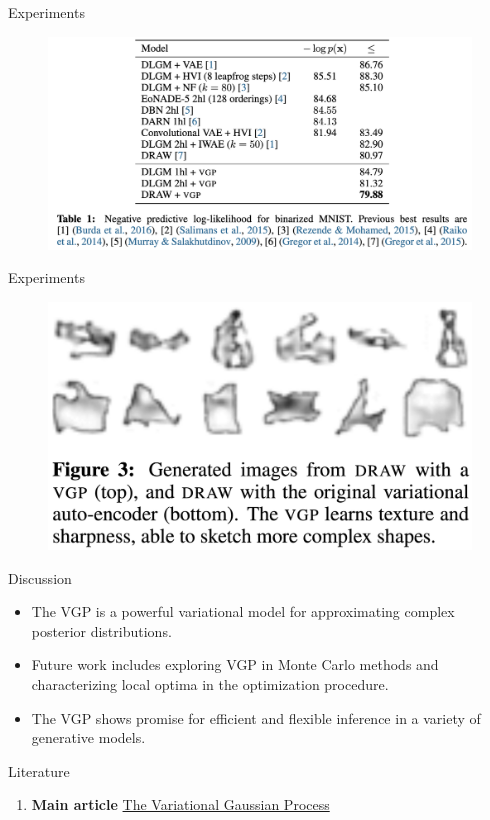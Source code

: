 \documentclass{beamer}
\begin{document}
\begin{frame}{Experiments}
    \begin{figure}{}
        \centering
        \includegraphics[scale=0.25]{images/table.png}
    \end{figure}
\end{frame}

\begin{frame}{Experiments}
    \begin{figure}{}
        \centering
        \includegraphics[scale=0.2]{images/figure3.png}
    \end{figure}

\end{frame}

\begin{frame}{Discussion}
    \begin{itemize}
        \item The VGP is a powerful variational model for approximating complex posterior distributions.
        \item Future work includes exploring VGP in Monte Carlo methods and characterizing local optima in the optimization procedure.
        \item The VGP shows promise for efficient and flexible inference in a variety of generative models.
    \end{itemize}
\end{frame}

\begin{frame}{Literature}
    \begin{enumerate}
        \item \textbf{Main article} \href{https://arxiv.org/pdf/1511.06499v4.pdf} 
        {The Variational Gaussian Process}
    \end{enumerate}
\end{frame}
\end{document}
